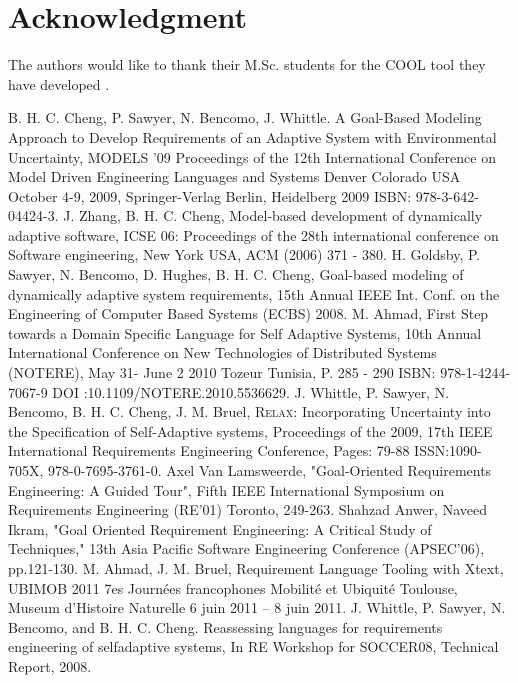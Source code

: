 \documentclass[10pt, conference, compsocconf]{IEEEtran}
\def\myrelax{\textsc{Relax}}                  %
\begin{document}
\section*{Acknowledgment}

The authors would like to thank their M.Sc. students for the COOL tool they have developed \cite{test10}.


\begin{thebibliography}{1}
B. H. C. Cheng, P. Sawyer, N. Bencomo, J. Whittle. A Goal-Based Modeling Approach to Develop Requirements of an Adaptive System with Environmental Uncertainty, MODELS '09 Proceedings of the 12th International Conference on Model Driven Engineering Languages and Systems Denver Colorado USA October 4-9, 2009, Springer-Verlag Berlin, Heidelberg 2009 ISBN: 978-3-642-04424-3.
J. Zhang, B. H. C. Cheng, Model-based development of dynamically adaptive software, ICSE 06: Proceedings of the 28th international conference on Software engineering, New York USA, ACM (2006) 371 - 380.
H. Goldsby, P.  Sawyer, N. Bencomo, D. Hughes, B. H. C. Cheng, Goal-based modeling of dynamically adaptive system requirements, 15th Annual IEEE Int. Conf. on the Engineering of Computer Based Systems (ECBS) 2008.
M. Ahmad, First Step towards a Domain Specific Language for Self Adaptive Systems, 10th Annual International Conference on New Technologies of Distributed Systems (NOTERE), May 31- June 2 2010 Tozeur Tunisia, P. 285 - 290 ISBN: 978-1-4244-7067-9 DOI :10.1109/NOTERE.2010.5536629.
J. Whittle, P. Sawyer, N. Bencomo, B. H. C. Cheng, J. M. Bruel, \myrelax{}: Incorporating Uncertainty into the Specification of Self-Adaptive systems, Proceedings of the 2009, 17th IEEE International Requirements Engineering Conference, Pages: 79-88 ISSN:1090-705X, 978-0-7695-3761-0.
Axel Van Lamsweerde, "Goal-Oriented Requirements Engineering: A Guided Tour", Fifth IEEE International Symposium on Requirements Engineering (RE'01) Toronto, 249-263.
Shahzad Anwer, Naveed Ikram, "Goal Oriented Requirement Engineering: A Critical Study of Techniques," 13th Asia Pacific Software Engineering Conference (APSEC'06), pp.121-130.
M. Ahmad, J. M. Bruel, Requirement Language Tooling with Xtext, UBIMOB 2011 7es Journ\'ees francophones Mobilit\'e et Ubiquit\'e Toulouse, Museum d'Histoire Naturelle 6 juin 2011 -- 8 juin 2011.
J. Whittle, P. Sawyer, N. Bencomo, and B. H. C. Cheng. Reassessing languages for requirements engineering of selfadaptive systems, In RE Workshop for SOCCER08, Technical Report, 2008.

\end{thebibliography}
\end{document}
